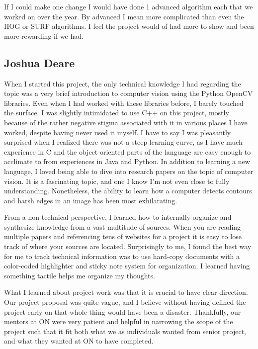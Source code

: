 \documentclass[letterpaper,10pt,titlepage]{article}
\begin{document}
If I could make one change I would have done 1 advanced algorithm each that we worked on over the year.
By advanced I mean more complicated than even the HOG or SURF algorithms. I feel
the project would of had more to show and been more rewarding if we had.

\subsection*{Joshua Deare}

When I started this project, the only technical knowledge I had regarding the topic was 
a very brief introduction to computer vision using the Python OpenCV libraries.
Even when I had worked with these libraries before, I barely touched the surface. 
I was slightly intimidated to use C++ on this project, mostly because of the rather 
negative stigma associated with it in various places I have worked, despite having never used it myself.
I have to say I was pleasantly surprised when I realized there was not a steep learning curve,
as I have much experience in C and the object oriented parts of the language are easy enough to acclimate to from experiences in Java and Python.
In addition to learning a new language, I loved being able to dive into research papers on the topic of computer vision.
It is a fascinating topic, and one I know I'm not even close to fully understanding. 
Nonetheless, the ability to learn how a computer detects contours and harsh edges in an image has been most exhilarating.

From a non-technical perspective, I learned how to internally organize and synthesize knowledge
from a vast multitude of sources. When you are reading multiple papers and referencing tens
of websites for a project it is easy to lose track of where your sources are located.
Surprisingly to me, I found the best way for me to track technical information was
to use hard-copy documents with a color-coded highlighter and sticky note system
for organization. I learned having something tactile helps me organize my thoughts.

What I learned about project work was that it is crucial to have clear direction.
Our project proposal was quite vague, and I believe without having defined the
project early on that whole thing would have been a disaster. 
Thankfully, our mentors at ON were very patient and helpful in narrowing the scope
of the project such that it fit both what we as individuals wanted from senior project,
and what they wanted at ON to have completed.
\end{document}
